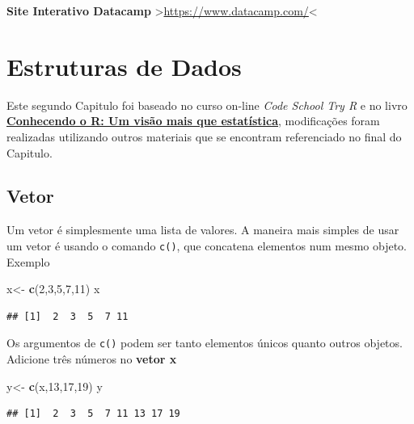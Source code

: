 \documentclass[]{book}
\newenvironment{Shaded}{\begin{snugshade}}{\end{snugshade}}
\newcommand{\DecValTok}[1]{\textcolor[rgb]{0.00,0.00,0.81}{#1}}
\newcommand{\KeywordTok}[1]{\textcolor[rgb]{0.13,0.29,0.53}{\textbf{#1}}}
\newcommand{\NormalTok}[1]{#1}
\newcommand{\StringTok}[1]{\textcolor[rgb]{0.31,0.60,0.02}{#1}}
\begin{document}
\textbf{Site Interativo Datacamp} \textgreater{}\url{https://www.datacamp.com/}\textless{}

\hypertarget{estruturas-de-dados}{%
\chapter{Estruturas de Dados}\label{estruturas-de-dados}}

Este segundo Capitulo foi baseado no curso on-line \emph{Code School Try R} e no livro \href{https://www.editoraufv.com.br/produto/conhecendo-o-r-uma-visao-mais-que-estatistica/1109294}{\textbf{Conhecendo o R: Um visão mais que estatística}}, modificações foram realizadas utilizando outros materiais que se encontram referenciado no final do Capitulo.

\hypertarget{vetor}{%
\section{Vetor}\label{vetor}}

Um vetor é simplesmente uma lista de valores.
A maneira mais simples de usar um vetor é usando o comando \texttt{c()}, que concatena elementos num mesmo objeto.
Exemplo

\begin{Shaded}
\begin{Highlighting}[]
\NormalTok{x<-}\StringTok{ }\KeywordTok{c}\NormalTok{(}\DecValTok{2}\NormalTok{,}\DecValTok{3}\NormalTok{,}\DecValTok{5}\NormalTok{,}\DecValTok{7}\NormalTok{,}\DecValTok{11}\NormalTok{) }
\NormalTok{x}
\end{Highlighting}
\end{Shaded}

\begin{verbatim}
## [1]  2  3  5  7 11
\end{verbatim}

Os argumentos de \texttt{c()} podem ser tanto elementos únicos quanto outros objetos. Adicione três números no \textbf{vetor x}

\begin{Shaded}
\begin{Highlighting}[]
\NormalTok{y<-}\StringTok{ }\KeywordTok{c}\NormalTok{(x,}\DecValTok{13}\NormalTok{,}\DecValTok{17}\NormalTok{,}\DecValTok{19}\NormalTok{)}
\NormalTok{y}
\end{Highlighting}
\end{Shaded}

\begin{verbatim}
## [1]  2  3  5  7 11 13 17 19
\end{verbatim}
\end{document}
